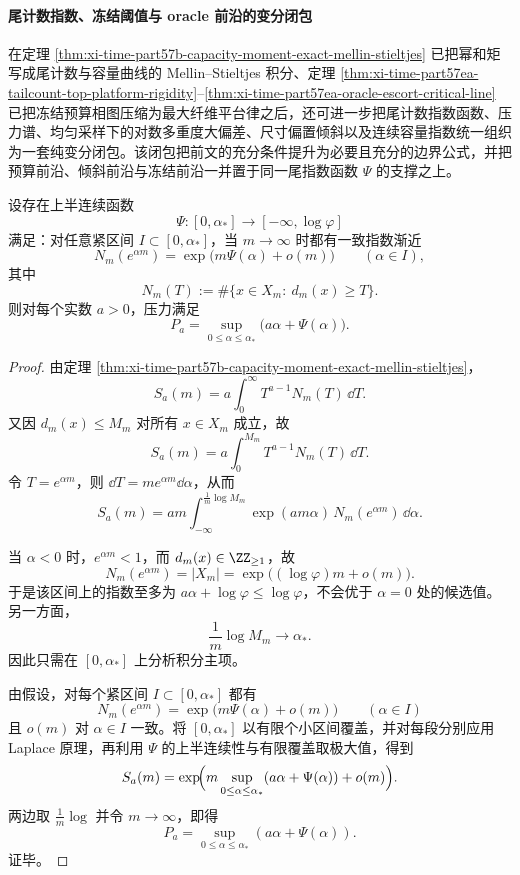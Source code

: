 \paragraph{尾计数指数、冻结阈值与 oracle 前沿的变分闭包}
在定理 \ref{thm:xi-time-part57b-capacity-moment-exact-mellin-stieltjes} 已把幂和矩写成尾计数与容量曲线的 Mellin--Stieltjes 积分、定理 \ref{thm:xi-time-part57ea-tailcount-top-platform-rigidity}--\ref{thm:xi-time-part57ea-oracle-escort-critical-line} 已把冻结预算相图压缩为最大纤维平台律之后，还可进一步把尾计数指数函数、压力谱、均匀采样下的对数多重度大偏差、尺寸偏置倾斜以及连续容量指数统一组织为一套纯变分闭包。该闭包把前文的充分条件提升为必要且充分的边界公式，并把预算前沿、倾斜前沿与冻结前沿一并置于同一尾指数函数 \(\Psi\) 的支撑之上。

\begin{theorem}\label{thm:xi-time-part57eb-tail-laplace-mellin-variational}
设存在上半连续函数
\[
\Psi:[0,\alpha_*]\to[-\infty,\log\varphi]
\]
满足：对任意紧区间 \(I\subset[0,\alpha_*]\)，当 \(m\to\infty\) 时都有一致指数渐近
\[
N_m(e^{\alpha m})
=
\exp\!\bigl(m\Psi(\alpha)+o(m)\bigr)
\qquad
(\alpha\in I),
\]
其中
\[
N_m(T):=\#\{x\in X_m:\ d_m(x)\ge T\}.
\]
则对每个实数 \(a>0\)，压力满足
\[
\boxed{\;
P_a=\sup_{0\le \alpha\le \alpha_*}\bigl(a\alpha+\Psi(\alpha)\bigr).\;}
\]
\end{theorem}
\begin{proof}
由定理 \ref{thm:xi-time-part57b-capacity-moment-exact-mellin-stieltjes}，
\[
S_a(m)=a\int_0^\infty T^{a-1}N_m(T)\,\dd T.
\]
又因 \(d_m(x)\le M_m\) 对所有 \(x\in X_m\) 成立，故
\[
S_a(m)=a\int_0^{M_m}T^{a-1}N_m(T)\,\dd T.
\]
令 \(T=e^{\alpha m}\)，则 \(\dd T=me^{\alpha m}\dd\alpha\)，从而
\[
S_a(m)
=
am\int_{-\infty}^{\frac1m\log M_m}
\exp(am\alpha)\,N_m(e^{\alpha m})\,\dd\alpha.
\]

当 \(\alpha<0\) 时，\(e^{\alpha m}<1\)，而 \(d_m(x)\in\ZZ_{\ge 1}\)，故
\[
N_m(e^{\alpha m})=|X_m|
=
\exp\!\bigl((\log\varphi)m+o(m)\bigr).
\]
于是该区间上的指数至多为 \(a\alpha+\log\varphi\le \log\varphi\)，不会优于 \(\alpha=0\) 处的候选值。另一方面，
\[
\frac1m\log M_m\to \alpha_*.
\]
因此只需在 \([0,\alpha_*]\) 上分析积分主项。

由假设，对每个紧区间 \(I\subset[0,\alpha_*]\) 都有
\[
N_m(e^{\alpha m})=\exp\!\bigl(m\Psi(\alpha)+o(m)\bigr)
\qquad(\alpha\in I)
\]
且 \(o(m)\) 对 \(\alpha\in I\) 一致。将 \([0,\alpha_*]\) 以有限个小区间覆盖，并对每段分别应用 Laplace 原理，再利用 \(\Psi\) 的上半连续性与有限覆盖取极大值，得到
\[
S_a(m)
=
\exp\!\Bigl(
m\sup_{0\le \alpha\le \alpha_*}(a\alpha+\Psi(\alpha))+o(m)
\Bigr).
\]
两边取 \(\frac1m\log\) 并令 \(m\to\infty\)，即得
\[
P_a=\sup_{0\le \alpha\le \alpha_*}(a\alpha+\Psi(\alpha)).
\]
证毕。
\end{proof}

